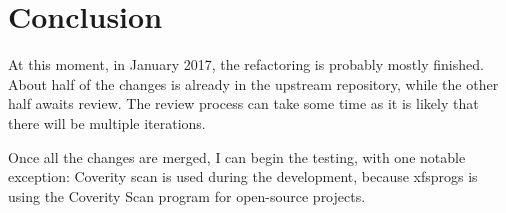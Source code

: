 
\chapter{Conclusion} \label{chap:conclusion}

At this moment, in January 2017, the refactoring is probably mostly finished. About half of the changes is already in the upstream repository, while the other half awaits review. The review process can take some time as it is likely that there will be multiple iterations.

Once all the changes are merged, I can begin the testing, with one notable exception: Coverity scan is used during the development, because xfsprogs is using the Coverity Scan program for open-source projects.

